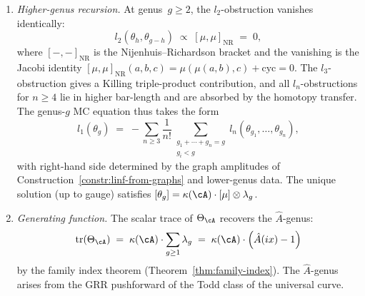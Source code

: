 \begin{theorem}
\begin{enumerate}[label=\textup{(\alph*)}]
\item \emph{Higher-genus recursion.}
  At genus~$g \geq 2$, the $l_2$-obstruction vanishes
  identically:
  \begin{equation}\label{eq:l2-vanishes}
  l_2(\theta_h, \theta_{g-h})
  \;\propto\;
  [\mu,\mu]_{\mathrm{NR}}
  \;=\; 0,
  \end{equation}
  where $[-,-]_{\mathrm{NR}}$ is the Nijenhuis--Richardson bracket
  and the vanishing is the Jacobi identity
  $[\mu,\mu]_{\mathrm{NR}}(a,b,c) = \mu(\mu(a,b),c) + \text{cyc}
  = 0$.  The $l_3$-obstruction gives a Killing triple-product
  contribution, and all $l_n$-obstructions for $n \geq 4$
  lie in higher bar-length and are absorbed by the homotopy
  transfer.  The genus-$g$ MC equation thus takes the form
  \begin{equation}\label{eq:genus-g-recursion}
  l_1(\theta_g) \;=\;
  -\sum_{n \geq 3} \frac{1}{n!}
  \sum_{\substack{g_1+\cdots+g_n = g \\ g_i < g}}
  l_n(\theta_{g_1}, \ldots, \theta_{g_n}),
  \end{equation}
  with right-hand side determined by the graph amplitudes of
  Construction~\textup{\ref{constr:linf-from-graphs}} and
  lower-genus data.  The unique solution
  \textup{(}up to gauge\textup{)} satisfies
  $[\theta_g] = \kappa(\cA) \cdot [\mu] \otimes \lambda_g$.

\item \emph{Generating function.}
  The scalar trace of $\Theta_{\cA}$ recovers the $\hat{A}$-genus:
  \begin{equation}\label{eq:theta-generating-function}
  \operatorname{tr}(\Theta_{\cA})
  \;=\;
  \kappa(\cA) \cdot \sum_{g \geq 1} \lambda_g
  \;=\;
  \kappa(\cA) \cdot
  \Bigl(\hat{A}(ix) - 1\Bigr)
  \end{equation}
  by the family index theorem
  \textup{(}Theorem~\textup{\ref{thm:family-index}}\textup{)}.
  The $\hat{A}$-genus arises from the GRR pushforward of the
  Todd class of the universal curve.
\end{enumerate}
\end{theorem}

